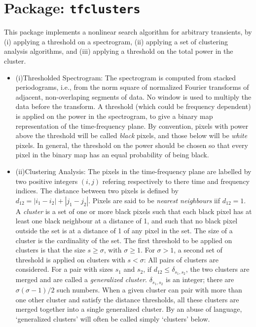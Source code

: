 \chapter{Package: \texttt{tfclusters}}
     This package implements a nonlinear search algorithm for arbitrary transients, by (i) applying a threshold on a spectrogram, (ii) applying a set of clustering analysis algorithms, and (iii) applying a threshold on the total power in the cluster.

\begin{itemize}

\item{(i)Thresholded Spectrogram:} The spectrogram is computed from stacked periodograms, i.e., from the norm square of normalized Fourier transforms of adjacent, non-overlaping segments of data. No window is used to multiply the data before the transform. A threshold (which could be frequency dependent) is applied on the power in the spectrogram, to give a binary map representation of the time-frequency plane. By convention, pixels with power above the threshold will be called {\it black} pixels, and those below will be {\it white} pixels. In general, the threshold on the power should be chosen so that every pixel in the binary map has an equal probability of being black.
\item{(ii)Clustering Analysis:} The pixels in the time-frequency plane are labelled by two positive integers $(i,j)$ refering respectively to there time and frequency indices. The distance between two pixels is defined by $d_{12} = |i_1 - i_2| + |j_1 - j_2|$. Pixels are said to be {\it nearest neighbours} iif $d_{12} = 1$. A {\it cluster} is a set of one or more black pixels such that each black pixel has at least one black neighbour at a distance of 1, and such that no black pixel outside the set is at a distance of 1 of any pixel in the set. The size of a cluster is the cardinality of the set.
The first threshold to be applied on clusters is that the size $s \geq \sigma$, with $\sigma \geq 1$.
For $\sigma > 1$, a second set of threshold is applied on clusters with $s < \sigma$: All pairs of clusters are considered. For a pair with sizes $s_1$ and $s_2$, if $d_{12} \leq \delta_{s_1,s_2}$, the two clusters are merged and are called a {\it generalized cluster}. $\delta_{s_1,s_2}$ is an integer; there are $\sigma(\sigma-1)/2$ such numbers. When a given cluster can pair with more than one other cluster and satisfy the distance thresholds, all these clusters are merged together into a single generalized cluster.
By an abuse of language, `generalized clusters' will often be called simply `clusters' below.

\end{itemize}
